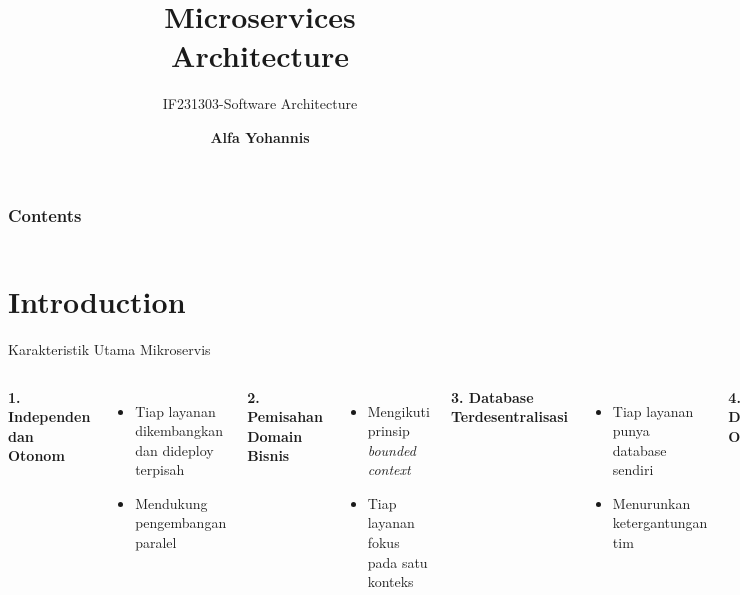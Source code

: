 \documentclass[aspectratio=169, table]{beamer}
\title{\Huge Microservices\\Architecture\\}
\subtitle{IF231303-Software Architecture}
\author{\textbf{Alfa Yohannis}}
\begin{document}
	
	\frame{\titlepage}
	
	
	\begin{frame}[fragile]
		\frametitle{Contents}
		\vspace{20pt}
		\begin{columns}[t]
			\tableofcontents[sections={1-5}]
			
			\tableofcontents[sections={6-10}]
		\end{columns}
	\end{frame}
	
	\section{Introduction}
	\begin{frame}[fragile]{Karakteristik Utama Mikroservis}
		\vspace{10pt}
		\begin{columns}[T]
			\textbf{1. Independen dan Otonom}
			\begin{itemize}
				\item Tiap layanan dikembangkan dan dideploy terpisah
				\item Mendukung pengembangan paralel
			\end{itemize}
			
			\textbf{2. Pemisahan Domain Bisnis}
			\begin{itemize}
				\item Mengikuti prinsip \textit{bounded context}
				\item Tiap layanan fokus pada satu konteks
			\end{itemize}
			
			\textbf{3. Database Terdesentralisasi}
			\begin{itemize}
				\item Tiap layanan punya database sendiri
				\item Menurunkan ketergantungan tim
			\end{itemize}
			
			\textbf{4. Deployment Otonom}
			\begin{itemize}
				\item Layanan dirilis tanpa ganggu sistem
				\item Cocok untuk CI/CD dan rollback
			\end{itemize}
			
			\textbf{5. Polyglot Technology}
			\begin{itemize}
				\item Tiap tim bebas pilih teknologi
				\item Sesuai kebutuhan domain
			\end{itemize}
			
			\textbf{Manfaat Umum}
			\begin{itemize}
				\item Modular, skalabel, fleksibel
				\item Perlu pengelolaan yang matang
			\end{itemize}
		\end{columns}
	\end{frame}
	
\end{document}
